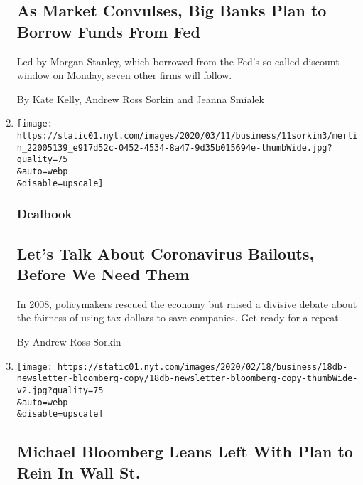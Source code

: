 \begin{enumerate}
  \hypertarget{as-market-convulses-big-banks-plan-to-borrow-funds-from-fed}{%
  \subsection{As Market Convulses, Big Banks Plan to Borrow Funds From
  Fed}\label{as-market-convulses-big-banks-plan-to-borrow-funds-from-fed}}

  Led by Morgan Stanley, which borrowed from the Fed's so-called
  discount window on Monday, seven other firms will follow.

  By Kate Kelly, Andrew Ross Sorkin and Jeanna Smialek
\item
  \href{/2020/03/11/business/dealbook/coronavirus-bailouts.html}{}

  \texttt{[image: https://static01.nyt.com/images/2020/03/11/business/11sorkin3/merlin\_22005139\_e917d52c-0452-4534-8a47-9d35b015694e-thumbWide.jpg?quality=75\\\&auto=webp\\\&disable=upscale]}

  \hypertarget{dealbook-3}{%
  \subsubsection{Dealbook}\label{dealbook-3}}

  \hypertarget{lets-talk-about-coronavirus-bailouts-before-we-need-them}{%
  \subsection{Let's Talk About Coronavirus Bailouts, Before We Need
  Them}\label{lets-talk-about-coronavirus-bailouts-before-we-need-them}}

  In 2008, policymakers rescued the economy but raised a divisive debate
  about the fairness of using tax dollars to save companies. Get ready
  for a repeat.

  By Andrew Ross Sorkin
\item
  \href{/2020/02/18/business/dealbook/michael-bloomberg-wall-street.html}{}

  \texttt{[image: https://static01.nyt.com/images/2020/02/18/business/18db-newsletter-bloomberg-copy/18db-newsletter-bloomberg-copy-thumbWide-v2.jpg?quality=75\\\&auto=webp\\\&disable=upscale]}

  \hypertarget{michael-bloomberg-leans-left-with-plan-to-rein-in-wall-st}{%
  \subsection{Michael Bloomberg Leans Left With Plan to Rein In Wall
  St.}\label{michael-bloomberg-leans-left-with-plan-to-rein-in-wall-st}}


\end{enumerate}
